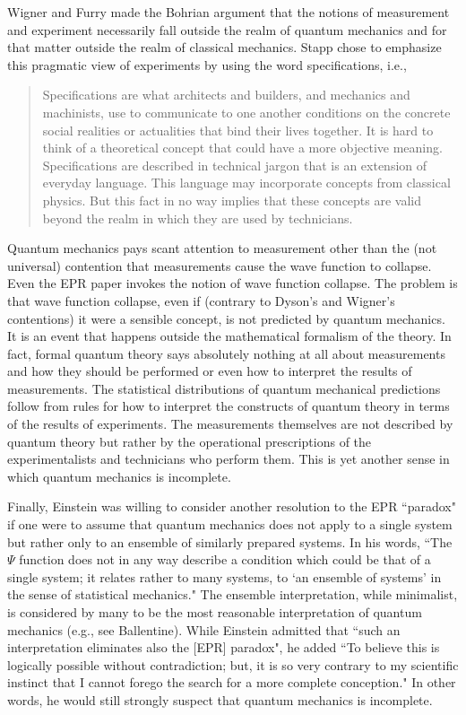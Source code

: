 \documentclass[12pt]{article}
\begin{document}
Wigner\cite{Wig62} and Furry\cite{Fur62} made the Bohrian argument that the notions of measurement and experiment necessarily fall outside the realm of quantum mechanics and for that matter outside the realm of classical mechanics.  Stapp chose to emphasize this pragmatic view of experiments by using the word specifications, i.e.,\cite{Sta72}
\begin{quotation}
Specifications are what architects and builders, and mechanics and machinists, use to communicate to one another conditions on the concrete social realities or actualities that bind their lives together. It is hard to think of a theoretical concept that could have a more objective meaning. Specifications are described in technical jargon that is an extension of everyday language. This language may incorporate concepts from classical physics. But this fact in no way implies that these concepts are valid beyond the realm in which they are used by technicians.
\end{quotation}
Quantum mechanics pays scant attention to measurement other than the (not universal) contention that measurements cause the wave function to collapse.  Even the EPR paper invokes the notion of wave function collapse.  The problem is that wave function collapse, even if (contrary to Dyson's and Wigner's contentions) it were a sensible concept, is not predicted by quantum mechanics. It is an event that happens outside the mathematical formalism of the theory. In fact, formal quantum theory says absolutely nothing at all about measurements and how they should be performed or even how to interpret the results of measurements. The statistical distributions of quantum mechanical predictions follow from rules for how to interpret the constructs of quantum theory in terms of the results of experiments. The measurements themselves are not described by quantum theory but rather by the operational prescriptions of the experimentalists and technicians who perform them. This is yet another sense in which quantum mechanics is incomplete.

Finally, Einstein was willing to consider another resolution to the EPR ``paradox" if one were to assume that quantum mechanics does not apply to a single system but rather only to an ensemble of similarly prepared systems.  In his words, ``The $\Psi$ function does not in any way describe a condition which could be that of a single system; it relates rather to many systems, to `an ensemble of systems' in the sense of statistical mechanics."\cite{Ein36}  The ensemble interpretation, while minimalist, is considered by many to be the most reasonable interpretation of quantum mechanics (e.g., see Ballentine\cite{Bal70}).  While Einstein admitted that ``such an interpretation eliminates also the [EPR] paradox", he added ``To believe this is logically possible without contradiction; but, it is so very contrary to my scientific instinct that I cannot forego the search for a more complete conception." In other words, he would still strongly suspect that quantum mechanics is incomplete.
\end{document}
